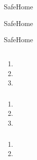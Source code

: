 

SafeHome


SafeHome


SafeHome

\hypertarget{section-44}{%
\subsection{}\label{section-44}}

\hypertarget{section-45}{%
\subsubsection{}\label{section-45}}

\begin{enumerate}
\def\labelenumi{\arabic{enumi}.}
\tightlist
\item
\item
\item
\end{enumerate}

\hypertarget{section-46}{%
\subsubsection{}\label{section-46}}

\begin{enumerate}
\def\labelenumi{\arabic{enumi}.}
\tightlist
\item
\item
\item
\end{enumerate}

\hypertarget{section-47}{%
\subsubsection{}\label{section-47}}

\begin{enumerate}
\def\labelenumi{\arabic{enumi}.}
\tightlist
\item
\item
\end{enumerate}

\hypertarget{section-48}{%
\subsection{}\label{section-48}}

